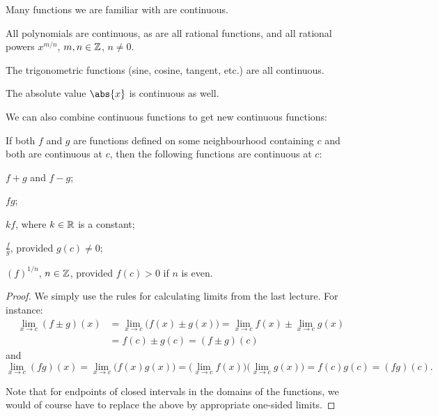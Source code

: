 
Many functions we are familiar with are continuous.

\begin{examples}
	All polynomials are continuous, as are all rational functions, and all rational powers $x^{m/n}$, $m, n \in \mathbb{Z}$, $n \neq 0$.

	The trigonometric functions (sine, cosine, tangent, etc.) are all continuous.

	The absolute value $\abs{x}$ is continuous as well.
\end{examples}

\noindent
We can also combine continuous functions to get new continuous functions:

\begin{theorem}
	If both $f$ and $g$ are functions defined on some neighbourhood containing $c$ and both are continuous at $c$, then the following functions are continuous at $c$:
	\begin{romanlist}
		\item $f + g$ and $f - g$;
		\item $fg$;
		\item $k f$, where $k \in \mathbb{R}$ is a constant;
		\item $\displaystyle \frac{f}{g}$, provided $g(c) \neq 0$;
		\item $(f)^{1 / n}$, $n \in \mathbb{Z}$, provided $f(c) > 0$ if $n$ is even.
	\end{romanlist}
\end{theorem}

\begin{proof}
	We simply use the rules for calculating limits from the last lecture.
	For instance:
	\begin{align*}
		\lim_{x \to c} (f \pm g)(x) & = \lim_{x \to c} \big ( f(x) \pm g(x) \big ) = \lim_{x \to c} f(x) \pm \lim_{x \to c} g(x) \\
		                            & = f(c) \pm g(c) = (f \pm g)(c)
	\end{align*}
	and
	\[
		\lim_{x \to c} (fg)(x) = \lim_{x \to c} \big ( f(x)g(x) \big ) = \big ( \lim_{x \to c} f(x) \big ) \big ( \lim_{x \to c} g(x) \big ) = f(c) g(c) = (fg)(c).
	\]

	\noindent
	Note that for endpoints of closed intervals in the domains of the functions, we would of course have to replace the above by appropriate one-sided limits.
\end{proof}

